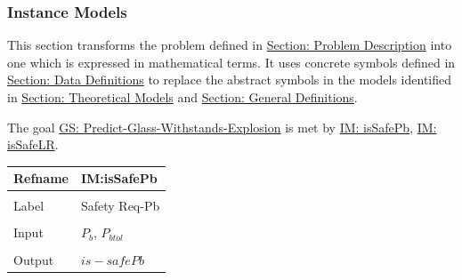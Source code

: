 \documentclass[12pt]{article}
\begin{document}
\subsubsection{Instance Models}
\label{Sec:IMs}
This section transforms the problem defined in \hyperref[Sec:ProbDesc]{Section: Problem Description} into one which is expressed in mathematical terms. It uses concrete symbols defined in \hyperref[Sec:DDs]{Section: Data Definitions} to replace the abstract symbols in the models identified in \hyperref[Sec:TMs]{Section: Theoretical Models} and \hyperref[Sec:GDs]{Section: General Definitions}.

The goal \hyperref[willBreakGS]{GS: Predict-Glass-Withstands-Explosion} is met by \hyperref[IM:isSafePb]{IM: isSafePb}, \hyperref[IM:isSafeLR]{IM: isSafeLR}.


\noindent \begin{minipage}{\textwidth}
\begin{tabular}{>{\raggedright}p{}>{\raggedright\arraybackslash}p{}}
\toprule \textbf{Refname} & \textbf{IM:isSafePb}
\label{IM:isSafePb}
\\ \midrule \\
Label & Safety Req-Pb
        
\\ \midrule \\
Input & ${P_{b}}$, ${P_{btol}}$
        
\\ \midrule \\
Output & $is-safePb$
         

\end{tabular}
\end{minipage}
\end{document}
